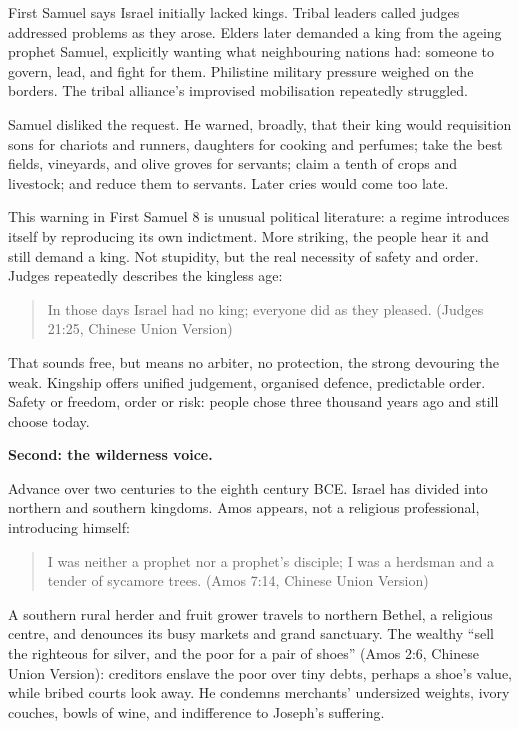 First Samuel says Israel initially lacked kings. Tribal leaders called judges addressed problems as they arose. Elders later demanded a king from the ageing prophet Samuel, explicitly wanting what neighbouring nations had: someone to govern, lead, and fight for them. Philistine military pressure weighed on the borders. The tribal alliance's improvised mobilisation repeatedly struggled.

Samuel disliked the request. He warned, broadly, that their king would requisition sons for chariots and runners, daughters for cooking and perfumes; take the best fields, vineyards, and olive groves for servants; claim a tenth of crops and livestock; and reduce them to servants. Later cries would come too late.

This warning in First Samuel 8 is unusual political literature: a regime introduces itself by reproducing its own indictment. More striking, the people hear it and still demand a king. Not stupidity, but the real necessity of safety and order. Judges repeatedly describes the kingless age:

\begin{quote}
In those days Israel had no king; everyone did as they pleased. (Judges 21:25, Chinese Union Version)
\end{quote}
That sounds free, but means no arbiter, no protection, the strong devouring the weak. Kingship offers unified judgement, organised defence, predictable order. Safety or freedom, order or risk: people chose three thousand years ago and still choose today.

\textbf{Second: the wilderness voice.}

Advance over two centuries to the eighth century BCE. Israel has divided into northern and southern kingdoms. Amos appears, not a religious professional, introducing himself:

\begin{quote}
I was neither a prophet nor a prophet's disciple; I was a herdsman and a tender of sycamore trees. (Amos 7:14, Chinese Union Version)
\end{quote}
A southern rural herder and fruit grower travels to northern Bethel, a religious centre, and denounces its busy markets and grand sanctuary. The wealthy ``sell the righteous for silver, and the poor for a pair of shoes'' (Amos 2:6, Chinese Union Version): creditors enslave the poor over tiny debts, perhaps a shoe's value, while bribed courts look away. He condemns merchants' undersized weights, ivory couches, bowls of wine, and indifference to Joseph's suffering.

